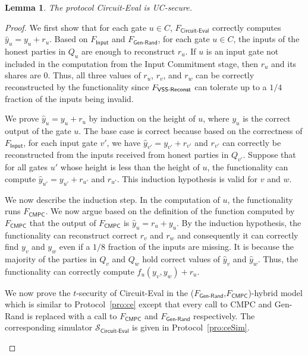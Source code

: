 \documentclass[11pt,letter]{article}
\newcommand{\alg}[1]{\mbox{\textsf{#1}}}
\newcommand{\func}[1]{\mbox{$F_\textsf{#1}$}}
\newcommand{\simu}[1]{\mbox{$\mathcal{S}_\textsf{#1}$}}
\newcommand{\mask}[1]{\widehat{#1}}
\theoremstyle{mytheoremstyle}
\newtheorem{lemma}{Lemma}
\let\savedCaption=\caption
\renewcommand*{\caption}[1]{\savedCaption[#1]{~#1}}
\newcommand{\algfont}{}
\newcommand{\fbad}{1/8\xspace}
\newcommand{\vssRec}{\textsf{VSS-Reconst}\xspace}
\begin{document}
\begin{lemma} \label{lem:ceuc}
	The protocol \textsf{Circuit-Eval} is UC-secure.
\end{lemma}
\begin{proof}
	We first show that for each gate $u \in C$, \func{Circuit-Eval} correctly computes $\mask{y}_u = y_u + r_u$. Based on \func{Input} and \func{Gen-Rand}, for each gate $u \in C$, the inputs of the honest parties in $Q_u$ are enough to reconstruct $r_u$. If $u$ is an input gate not included in the computation from the Input Commitment stage, then $r_u$ and its shares are 0. Thus, all three values of  $r_u$, $r_v$, and $r_w$ can be correctly reconstructed by the functionality since \func{\vssRec} can tolerate up to a $1/4$ fraction of the inputs being invalid.
	 
	We prove $\mask{y}_u = y_u + r_u$ by induction on the height of $u$, where $y_u$ is the correct output of the gate $u$. The base case is correct because based on the correctness of \func{Input}, for each input gate $v'$, we have $\mask{y}_{v'} = y_{v'} + r_{v'}$ and $r_{v'}$ can correctly be reconstructed from the inputs received from honest parties in $Q_{v'}$. Suppose that for all gates $u'$ whose height is less than the height of $u$, the functionality can compute $\mask{y}_{u'} = y_{u'} + r_{u'}$ and $r_{u'}$. This induction hypothesis is valid for $v$ and $w$.
	
	We now describe the induction step. In the computation of $u$, the functionality runs \func{CMPC}. We now argue based on the definition of the function computed by \func{CMPC} that the output of \func{CMPC} is $\mask{y}_u = r_u + y_u$. By the induction hypothesis, the functionality can reconstruct correct $r_v$ and $r_w$ and consequently it can correctly find $y_v$ and $y_w$ even if a $\fbad$ fraction of the inputs are missing. It is because the majority of the parties in $Q_v$ and $Q_w$ hold correct values of $\mask{y}_v$ and $\mask{y}_w$. Thus, the functionality can correctly compute $f_u(y_v,y_w) + r_u$. 

	We now prove the $t$-security of \alg{Circuit-Eval} in the (\func{Gen-Rand},\func{CMPC})-hybrid model which is similar to Protocol~\ref{pro:ce} except that every call to \alg{CMPC} and \alg{Gen-Rand} is replaced with a call to \func{CMPC} and \func{Gen-Rand} respectively. The corresponding simulator \simu{Circuit-Eval} is given in Protocol~\ref{pro:ceSim}.
	
	\begin{algorithm}
		\algfont
		\caption{\simu{Circuit-Eval}}
		\label{pro:ceSim}
		

\end{algorithm}
\end{proof}
\end{document}
